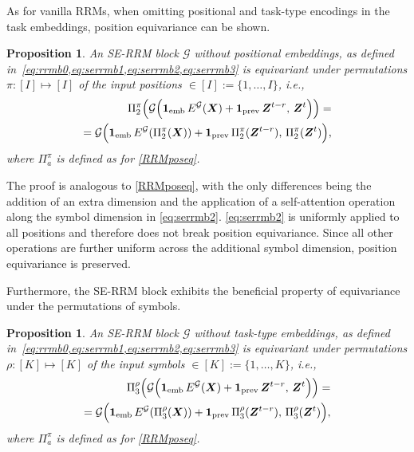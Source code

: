 \documentclass{article}
\theoremstyle{plain}
\newtheorem{proposition}[theorem]{Proposition}
\theoremstyle{definition}
\theoremstyle{remark}
\begin{document}
As for vanilla RRMs, when omitting positional and task-type encodings in the task embeddings, position equivariance can be shown.

\begin{proposition} \label{serrmposeq}
    An SE-RRM block $\mathcal G$ without positional embeddings, as defined in~\cref{eq:rrmb0,eq:serrmb1,eq:serrmb2,eq:serrmb3} is equivariant under permutations $\pi: [I] \mapsto [I]$ of the input positions $\in [I]:=\{1,\ldots,I\}$, i.e.,
\begin{align*}
\Pi_2^\pi\Big(\mathcal G\Big(\mathbf{1}_{\text{emb}}\, E^{\mathcal G}(\bm{X}) + \mathbf{1}_{\text{prev}}\, \bm{Z}^{t-r}, \, \bm{Z}^t\Big)\Big) = \nonumber \\
=\mathcal G\Big(\mathbf{1}_{\text{emb}}\, E^{\mathcal G}(\Pi_2^\pi(\bm{X})) + \mathbf{1}_{\text{prev}}\, \Pi_2^\pi(\bm{Z}^{t-r}), \, \Pi_2^\pi(\bm{Z}^t)\Big),
\end{align*}
where $\Pi_a^\pi$ is defined as for \cref{RRMposeq}.

\end{proposition}

The proof is analogous to \cref{RRMposeq}, with the only differences being the addition of an extra dimension and the application of a self-attention operation along the symbol dimension in \cref{eq:serrmb2}. \cref{eq:serrmb2} is uniformly applied to all positions and therefore does not break position equivariance. Since all other operations are further uniform across the additional symbol dimension, position equivariance is preserved.

Furthermore, the SE-RRM block exhibits the beneficial property of equivariance under the permutations of symbols.
\begin{proposition}
    An SE-RRM block $\mathcal G$ without task-type embeddings, as defined in~\cref{eq:rrmb0,eq:serrmb1,eq:serrmb2,eq:serrmb3} is equivariant under
    permutations $\rho: [K] \mapsto [K]$ of the input symbols $\in [K]:=\{1,\ldots,K\}$, i.e.,
\begin{align*}
\Pi_3^\rho\Big(\mathcal G\Big(\mathbf{1}_{\text{emb}}\, E^{\mathcal G}(\bm{X}) + \mathbf{1}_{\text{prev}}\, \bm{Z}^{t-r}, \, \bm{Z}^t\Big)\Big) = \nonumber \\
=\mathcal G\Big(\mathbf{1}_{\text{emb}}\, E^{\mathcal G}(\Pi_3^\rho(\bm{X})) + \mathbf{1}_{\text{prev}}\, \Pi_3^\rho(\bm{Z}^{t-r}), \, \Pi_3^\rho(\bm{Z}^t)\Big),
\end{align*}
where $\Pi_a^\pi$ is defined as for \cref{RRMposeq}.
\end{proposition}
\end{document}
